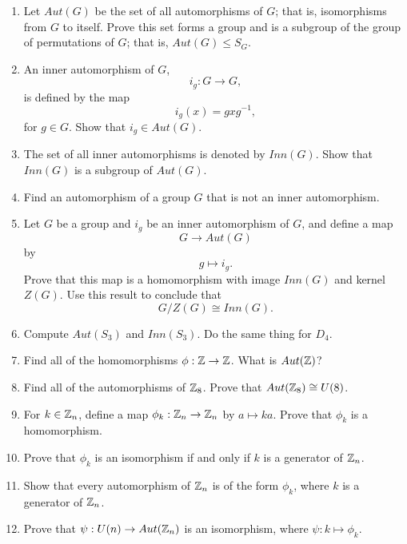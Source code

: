  
{\small
\begin{enumerate}
 
 
\bf\item\rm
Let $Aut(G)$ be the set of all automorphisms of $G$; that is,
isomorphisms from $G$ to itself. Prove this set forms a group and is a
subgroup of the group of permutations of $G$; that is, $Aut(G) \leq S_G$. 
 
 
\bf\item\rm
An {\bfi inner automorphism\/} of $G$,
$$
i_g : G \rightarrow G,
$$
is defined by the map
$$
i_g(x) = g x g^{-1},
$$
for $g \in G$. Show that $i_g \in Aut(G)$.
 
 
\bf\item\rm
The set of all inner automorphisms is denoted by $Inn(G)$. Show that
$Inn(G)$ is a subgroup of $Aut(G)$. 
 
 
\bf\item\rm
Find an automorphism of a group $G$ that is not an inner automorphism.
 
 
\bf\item\rm
Let $G$ be a group and $i_g$ be an inner automorphism of $G$, and
define a map 
$$
G \rightarrow Aut(G)
$$
by
$$
g \mapsto i_g.
$$
Prove that this map is a homomorphism with image $Inn(G)$ and kernel
$Z(G)$. Use this result to conclude that 
$$
G/Z(G) \cong Inn(G).
$$
 
 
\bf\item\rm
Compute $Aut(S_3)$ and $Inn(S_3)$.  Do the same thing for $D_4$.
 
 
\bf\item\rm
Find all of the homomorphisms $\phi : {\Bbb Z} \rightarrow {\Bbb Z}$.
What is $Aut({\Bbb Z})$? 
 
 
\bf\item\rm
Find all of the automorphisms of ${\Bbb Z}_8$.  Prove that $Aut({\Bbb
Z}_8) \cong U(8)$. 
 
 
\bf\item\rm
For $k \in {\Bbb Z}_n$, define a map $\phi_k : {\Bbb Z}_n \rightarrow
{\Bbb Z}_n$ by $a \mapsto ka$.  Prove that $\phi_k$ is a homomorphism. 
 
 
\bf\item\rm
Prove that $\phi_k$ is an isomorphism if and only if $k$ is a generator
of ${\Bbb Z}_n$. 
 
 
\bf\item\rm
Show that every automorphism of ${\Bbb Z}_n$ is of the form $\phi_k$,
where $k$ is a generator of ${\Bbb Z}_n$. 
 
 
\bf\item\rm
Prove that $\psi : U(n) \rightarrow Aut({\Bbb Z}_n)$ is an
isomorphism, where $\psi : k \mapsto \phi_k$. 
 
 
\end{enumerate}
}
 
 
 
 
 
